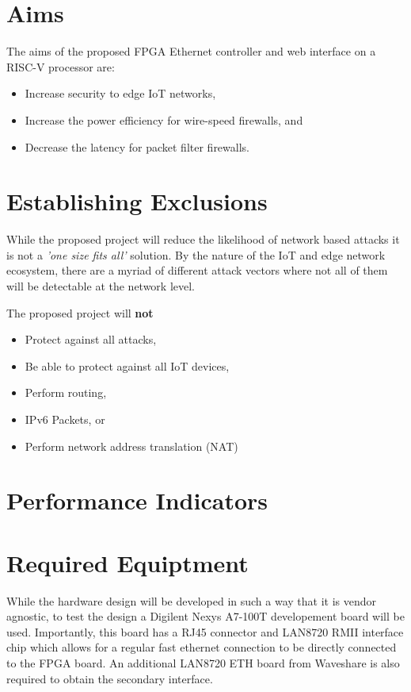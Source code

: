 \section{Aims}

The aims of the proposed FPGA Ethernet controller and web interface on a RISC-V processor are:

\begin{itemize}
    \item Increase security to edge IoT networks,
    \item Increase the power efficiency for wire-speed firewalls, and
    \item Decrease the latency for packet filter firewalls.
\end{itemize}



\section{Establishing Exclusions}

While the proposed project will reduce the likelihood of network based attacks it is not a \textit{'one size fits all'} solution. 
By the nature of the IoT and edge network ecosystem, there are a myriad of different attack vectors where not all of them will be detectable at the
network level.

The proposed project will \textbf{not}
\begin{itemize}
    \item Protect against all attacks,
    \item Be able to protect against all IoT devices,
    \item Perform routing,
    \item IPv6 Packets, or
    \item Perform network address translation (NAT)
\end{itemize}



\section{Performance Indicators}



\section{Required Equiptment}
While the hardware design will be developed in such a way that it is vendor agnostic, to test the design a Digilent Nexys A7-100T developement board will be used.
Importantly, this board has a RJ45 connector and LAN8720 RMII interface chip which allows for a regular fast ethernet connection to be directly connected 
to the FPGA board. An additional LAN8720 ETH board from Waveshare is also required to obtain the secondary interface. 

